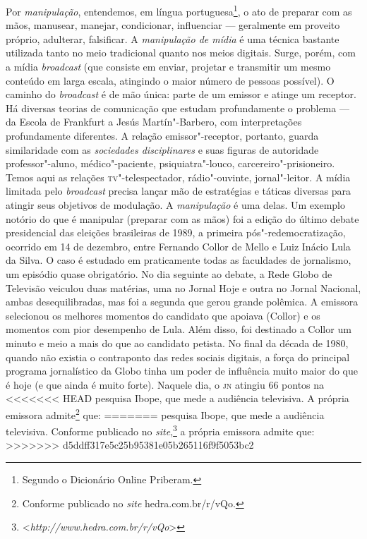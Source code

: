 Por \emph{manipulação}, entendemos, em língua portuguesa\footnote{Segundo o Dicionário Online Priberam.}, o
ato de preparar com as mãos, manusear, manejar, condicionar, influenciar
--- geralmente em proveito próprio, adulterar, falsificar. A
\emph{manipulação de mídia} é uma técnica bastante utilizada tanto no
meio tradicional quanto nos meios digitais. Surge, porém, com a mídia
\emph{broadcast} (que consiste em enviar, projetar e transmitir um mesmo
conteúdo em larga escala, atingindo o maior número de pessoas possível).
O caminho do \emph{broadcast} é de mão única: parte de um emissor e
atinge um receptor. Há diversas teorias de comunicação que estudam
profundamente o problema --- da Escola de Frankfurt a Jesús
Martín"-Barbero, com interpretações profundamente diferentes. A relação
emissor"-receptor, portanto, guarda similaridade com as \emph{sociedades
disciplinares} e suas figuras de autoridade professor"-aluno,
médico"-paciente, psiquiatra"-louco, carcereiro"-prisioneiro. Temos aqui as
relações \textsc{tv}"-telespectador, rádio"-ouvinte, jornal"-leitor. A mídia
limitada pelo \emph{broadcast} precisa lançar mão de estratégias e
táticas diversas para atingir seus objetivos de modulação. A
\emph{manipulação} é uma delas. Um exemplo notório do que é manipular
(preparar com as mãos) foi a edição do último debate presidencial das
eleições brasileiras de 1989, a primeira pós"-redemocratização, ocorrido
em 14 de dezembro, entre Fernando Collor de Mello e Luiz Inácio Lula da
Silva. O caso é estudado em praticamente todas as faculdades de
jornalismo, um episódio quase obrigatório. No dia seguinte ao debate, a
Rede Globo de Televisão veiculou duas matérias, uma no Jornal Hoje e
outra no Jornal Nacional, ambas desequilibradas, mas foi a segunda que
gerou grande polêmica. A emissora selecionou os melhores momentos do
candidato que apoiava (Collor) e os momentos com pior desempenho de Lula. 
Além disso, foi destinado a Collor um minuto e meio a mais do que ao
candidato petista. No final da década de 1980, quando não existia o
contraponto das redes sociais digitais, a força do principal programa
jornalístico da Globo tinha um poder de influência muito maior do que é
hoje (e que ainda é muito forte). Naquele dia, o \textsc{jn} atingiu 66 pontos na
<<<<<<< HEAD
pesquisa Ibope, que mede a audiência televisiva. A própria emissora admite\footnote{Conforme publicado no
\emph{site} hedra.com.br/r/vQo.} que:
=======
pesquisa Ibope, que mede a audiência televisiva. Conforme publicado no
\emph{site},\footnote{\textless{}\emph{http://www.hedra.com.br/r/vQo}\textgreater{}} a própria emissora admite que:
>>>>>>> d5ddff317e5c25b95381e05b265116f9f5053bc2

